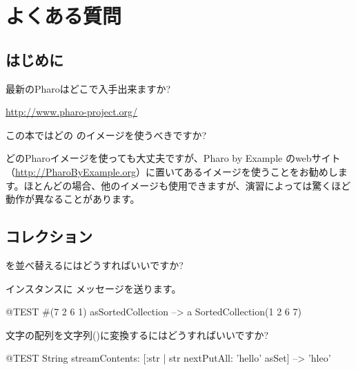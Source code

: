 \documentclass[a4paper,10pt,twoside]{book}
\begin{document}
	\renewcommand{\nnbb}[2]{} %
	\sloppy
\fi
\chapter{よくある質問}
\label{app:faq}


\section{はじめに}
\begin{faq}
最新のPharoはどこで入手出来ますか?
\end{faq}
\answer
\url{http://www.pharo-project.org/}

\begin{faq}
この本ではどの \pharo のイメージを使うべきですか?
\end{faq}
\answer
どのPharoイメージを使っても大丈夫ですが、Pharo by Example のwebサイト（\url{http://PharoByExample.org}）に置いてあるイメージを使うことをお勧めします。ほとんどの場合、他のイメージも使用できますが、演習によっては驚くほど動作が異なることがあります。

\section{コレクション}

\begin{faq}
 を並べ替えるにはどうすればいいですか?
\end{faq}
\answer
インスタンスに  メッセージを送ります。

\begin{code}{@TEST}
#(7 2 6 1) asSortedCollection --> a SortedCollection(1 2 6 7)
\end{code}

\begin{faq}
文字の配列を文字列()に変換するにはどうすればいいですか?
\end{faq}
\answer
\begin{code}{@TEST}
String streamContents: [:str | str nextPutAll: 'hello' asSet] --> 'hleo'
\end{code}
\end{document}
